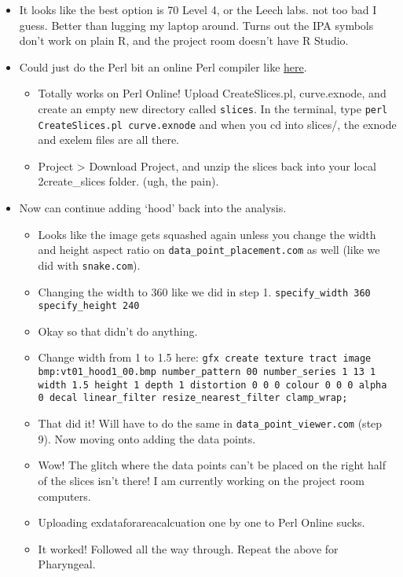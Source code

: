 \documentclass{article}
\begin{document}
\begin{itemize}
    \item It looks like the best option is 70 Level 4, or the Leech labs. not too bad I guess. Better than lugging my laptop around. Turns out the IPA symbols don't work on plain R, and the project room doesn't have R Studio.
    \item Could just do the Perl bit an online Perl compiler like \href{http://www.tutorialspoint.com/execute_perl_online.php}{here}. 
    \begin{itemize}
        \item Totally works on Perl Online! Upload CreateSlices.pl, curve.exnode, and create an empty new directory called \verb|slices|. In the terminal, type \verb|perl CreateSlices.pl curve.exnode| and when you cd into slices/, the exnode and exelem files are all there.
        \item Project > Download Project, and unzip the slices back into your local 2create_slices folder. (ugh, the pain).
    \end{itemize}
    \item Now can continue adding `hood' back into the analysis.
    \begin{itemize}
        \item Looks like the image gets squashed again unless you change the width and height aspect ratio on \verb|data_point_placement.com| as well (like we did with \verb|snake.com|).
        \item Changing the width to 360 like we did in step 1. \verb|specify_width 360 specify_height 240|
        \item Okay so that didn't do anything.
        \item Change width from 1 to 1.5 here: \verb|gfx create texture tract image bmp:vt01_hood1_00.bmp number_pattern 00 number_series 1 13 1 width 1.5 height 1 depth 1 distortion 0 0 0 colour 0 0 0 alpha 0 decal linear_filter resize_nearest_filter clamp_wrap;|
        \item That did it! Will have to do the same in \verb|data_point_viewer.com| (step 9). Now moving onto adding the data points.
        \item Wow! The glitch where the data points can't be placed on the right half of the slices isn't there! I am currently working on the project room computers.
        \item Uploading exdataforareacalcuation one by one to Perl Online sucks.
        \item It worked! Followed all the way through. Repeat the above for Pharyngeal.

\end{itemize}
\end{itemize}
\end{document}
